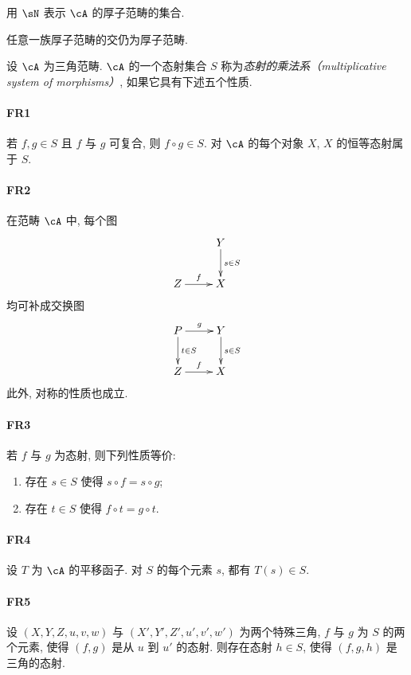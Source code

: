 用 $\sN$ 表示 $\cA$ 的厚子范畴的集合.

任意一族厚子范畴的交仍为厚子范畴.

\begin{definition}
设 $\cA$ 为三角范畴. $\cA$ 的一个态射集合 $S$ 称为\emph{态射的乘法系（multiplicative system of morphisms）}, 如果它具有下述五个性质.

\paragraph{FR1}
\hypertarget{VIII:FR1}{}
若 $f,g\in S$ 且 $f$ 与 $g$ 可复合, 则 $f\circ g\in S$. 对 $\cA$ 的每个对象 $X$, $X$ 的恒等态射属于 $S$.

\paragraph{FR2}
\hypertarget{VIII:FR2}{}
在范畴 $\cA$ 中, 每个图
\[\xymatrix{
  & Y \ar[d]^-{s\in S} \\
  Z \ar[r]^-f
    & X
}\]
均可补成交换图
\[\xymatrix{
  P \ar[r]^-g \ar[d]^-{t\in S}
    & Y \ar[d]^-{s\in S} \\
  Z \ar[r]^-f
    & X
}\]
此外, 对称的性质也成立.

\paragraph{FR3}
\hypertarget{VIII:FR3}{}
若 $f$ 与 $g$ 为态射, 则下列性质等价:
\begin{enumerate}[\indent i)]
  \item 存在 $s\in S$ 使得 $s\circ f=s\circ g$;
  \item 存在 $t\in S$ 使得 $f\circ t=g\circ t$.
\end{enumerate}

\paragraph{FR4}
\hypertarget{VIII:FR4}{}
设 $T$ 为 $\cA$ 的平移函子. 对 $S$ 的每个元素 $s$, 都有 $T(s)\in S$.

\paragraph{FR5}
\hypertarget{VIII:FR5}{}
设 $(X,Y,Z,u,v,w)$ 与 $(X',Y',Z',u',v',w')$ 为两个特殊三角, $f$ 与 $g$ 为 $S$ 的两个元素, 使得 $(f,g)$ 是从 $u$ 到 $u'$ 的态射. 则存在态射 $h\in S$, 使得 $(f,g,h)$ 是三角的态射.
\end{definition}

